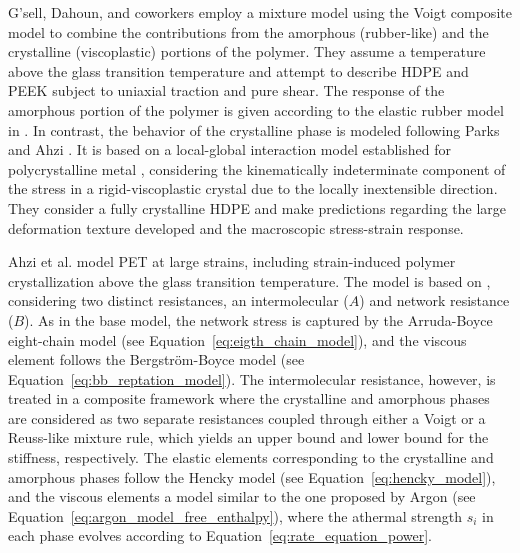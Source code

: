 G'sell, Dahoun, and coworkers \citep{gsellEvolutionMicrostructureSemicrystalline1994, dahounPlasticBehaviorDeformation1995} employ a mixture model using the Voigt composite model to combine the contributions from the amorphous (rubber-like) and the crystalline (viscoplastic) portions of the polymer.
They assume a temperature above the glass transition temperature and attempt to describe HDPE and PEEK subject to uniaxial traction and pure shear.
The response of the amorphous portion of the polymer is given according to the elastic rubber model in \cite{wuImprovedNetworkModels1993}.
 In contrast, the behavior of the crystalline phase is modeled following Parks and Ahzi \citep{parksPolycrystallinePlasticDeformation1990}.
It is based on a local-global interaction model established for polycrystalline metal \citep{molinariSelfConsistentApproach1987}, considering the kinematically indeterminate component of the stress in a rigid-viscoplastic crystal due to the locally inextensible direction.
They consider a fully crystalline HDPE and make predictions regarding the large deformation texture developed and the macroscopic stress-strain response.


Ahzi et al. \citep{ahziModelingDeformationBehavior2003} model PET at large strains, including strain-induced polymer crystallization above the glass transition temperature.
The model is based on \citep{boyceConstitutiveModelFinite2000}, considering two distinct resistances, an intermolecular ($A$) and network resistance ($B$).
As in the base model, the network stress is captured by the Arruda-Boyce eight-chain model (see Equation~\eqref{eq:eigth_chain_model}), and the viscous element follows the Bergström-Boyce model (see Equation~\eqref{eq:bb_reptation_model}).
The intermolecular resistance, however, is treated in a composite framework where the crystalline and amorphous phases are considered as two separate resistances coupled through either a Voigt or a Reuss-like mixture rule, which yields an upper bound and lower bound for the stiffness, respectively.
The elastic elements corresponding to the crystalline and amorphous phases follow the Hencky model (see Equation~\eqref{eq:hencky_model}), and the viscous elements a model similar to the one proposed by Argon (see Equation~\eqref{eq:argon_model_free_enthalpy}), where the athermal strength $s_i$ in each phase evolves according to Equation~\eqref{eq:rate_equation_power}.


